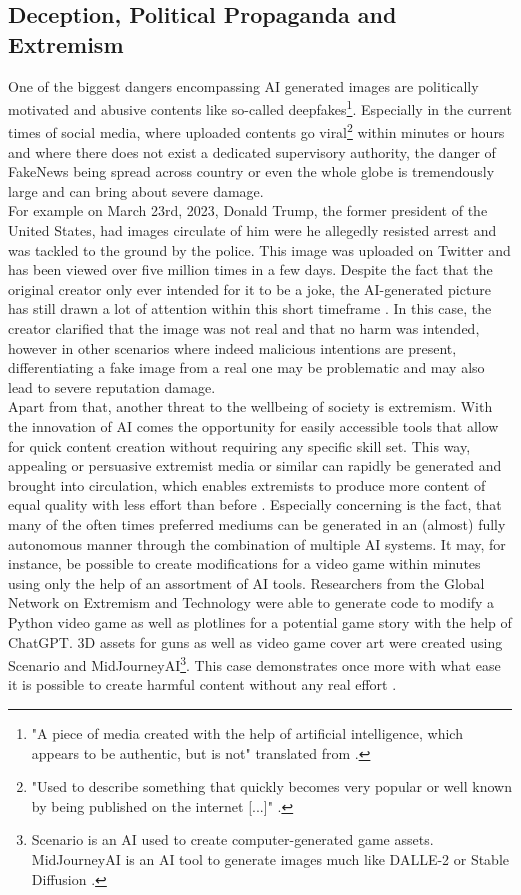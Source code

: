 \documentclass[10pt,twocolumn,twoside]{osajnl}
\begin{document}
\subsection{Deception, Political Propaganda and Extremism}
One of the biggest dangers encompassing AI generated images are politically motivated and abusive contents like so-called deepfakes\footnote[1]{"A piece of media created with the help of artificial intelligence, which appears to be authentic, but is not" translated from \cite{gabler}.}. 
Especially in the current times of social media, where uploaded contents go viral\footnote[2]{"Used to describe something that quickly becomes very popular or well known by being published on the internet [...]" \cite{viral}.} 
within minutes or hours and where there does not exist a dedicated supervisory authority, the danger of FakeNews being spread across country or even the whole globe is tremendously large and can bring about severe damage. \\ 
For example on March 23rd, 2023, Donald Trump, the former president of the United States, had images circulate of him 
were he allegedly resisted arrest and was tackled to the ground by the police. This image was uploaded on Twitter and has been viewed over five million times in a few days. Despite the fact that the original creator 
only ever intended for it to be a joke, the AI-generated picture has still drawn a lot of attention within this short timeframe \cite{trump}. In this case, the creator clarified that the image 
was not real and that no harm was intended, however in other scenarios where indeed malicious intentions are present, differentiating a fake image from a real one may be problematic and may also lead to severe reputation damage.
\\
Apart from that, another threat to the wellbeing of society is extremism. With the innovation of AI comes the opportunity for easily accessible tools that allow
for quick content creation without requiring any specific skill set. This way, appealing or persuasive extremist media or similar can rapidly be generated
and brought into circulation, which enables extremists to produce more content of equal quality with less effort than before \cite{AIPropaganda}.
Especially concerning is the fact, that many of the often times preferred mediums can be generated in an (almost) fully autonomous manner through the combination of multiple AI systems.
It may, for instance, be possible to create modifications for a video game within minutes using only the help of an assortment of AI tools.
Researchers from the Global Network on Extremism and Technology were able to generate code to modify a Python video game as well as plotlines for a potential game story with the help of ChatGPT. 
3D assets for guns as well as video game cover art were created using Scenario and MidJourneyAI\footnote[4]{Scenario is an AI used to create computer-generated game assets. MidJourneyAI
is an AI tool to generate images much like DALLE-2 or Stable Diffusion \cite{scenarioai}.}. This case demonstrates once more with what ease it is possible to create harmful content without any real effort \cite{AIPropaganda}. 
\end{document}
